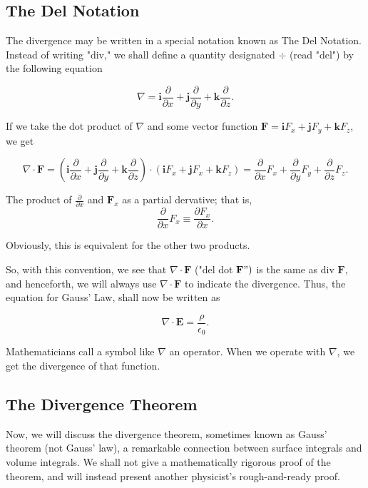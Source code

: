 \documentclass[11pt]{article}
\begin{document}
\subsection{The Del Notation}

The divergence may be written in a special notation known as The Del Notation. Instead of writing "div," we shall define a quantity designated $\div$ (read "del") by the following equation

\[
	\nabla = \mathbf{i} \frac{\partial}{\partial x} + \mathbf{j} \frac{\partial}{\partial y} + \mathbf{k} \frac{\partial}{\partial z}
.\]

If we take the dot product of $\nabla $ and some vector function $\mathbf{F} = \mathbf{i} F_x + \mathbf{j} F_y + \mathbf{k} F_z$, we get

\[
	\nabla \cdot \mathbf{F} = (\mathbf{i} \frac{\partial}{\partial x} + \mathbf{j}\frac{\partial}{\partial y} + \mathbf{k} \frac{\partial}{\partial z}) \cdot (\mathbf{i}F_x + \mathbf{j}F_x + \mathbf{k}F_z) = \frac{\partial}{\partial x}F_x + \frac{\partial}{\partial y} F_y + \frac{\partial}{\partial z} F_z
.\]

The product of $\frac{\partial}{\partial x}$ and $\mathbf{F}_x$ as a partial dervative; that is,
\[
\frac{\partial}{\partial x}F_x \equiv \frac{\partial F_x}{\partial x}
.\]

Obviously, this is equivalent for the other two products.

So, with this convention, we see that $\nabla \cdot \mathbf{F}$ ("del dot $\mathbf{F}")$ is the same as div  $\mathbf{F}$, and henceforth, we will always use $\nabla \cdot \mathbf{F}$ to indicate the divergence. Thus, the equation for Gauss' Law, shall now be written as

\[
	\nabla \cdot \mathbf{E} = \frac{\rho}{\epsilon_0}
.\]

Mathematicians call a symbol like $\nabla $ an operator. When we operate with $\nabla $, we get the divergence of that function.

\subsection{The Divergence Theorem}

Now, we will discuss the divergence theorem, sometimes known as Gauss' theorem (not Gauss' law), a remarkable connection between surface integrals and volume integrals. We shall not give a mathematically rigorous proof of the theorem, and will instead present another physicist's rough-and-ready proof.
\end{document}
